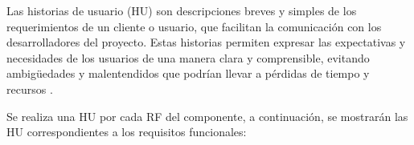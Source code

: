 Las historias de usuario (HU) son descripciones breves y simples de los requerimientos de un cliente o usuario, que facilitan la comunicación con los desarrolladores del proyecto. Estas historias permiten expresar las expectativas y necesidades de los usuarios de una manera clara y comprensible, evitando ambigüedades y malentendidos que podrían llevar a pérdidas de tiempo y recursos \cite{menzinsky2018historias}.

Se realiza una HU por cada RF del componente, a continuación, se mostrarán las HU correspondientes a los requisitos funcionales:


\begin{userstory}[hu:01] %
\end{userstory}
